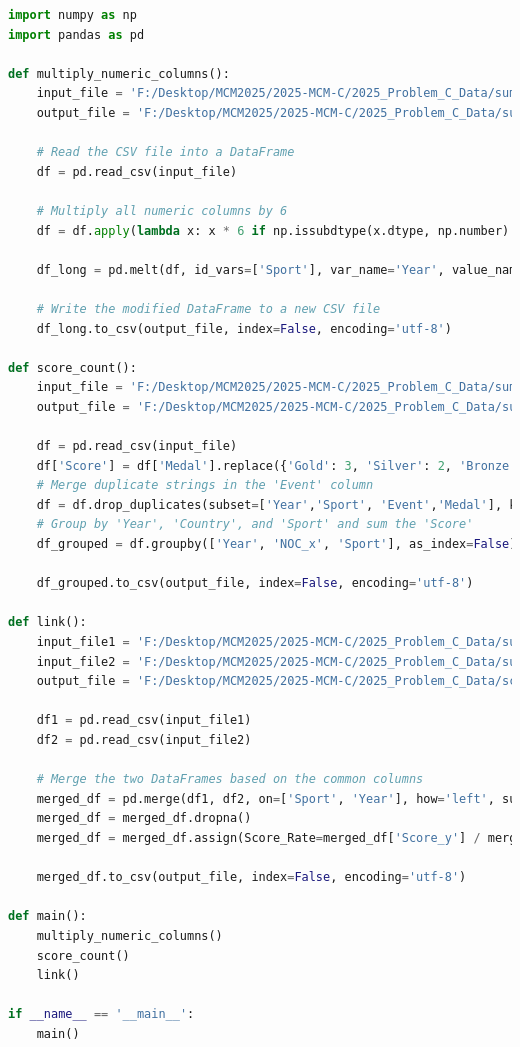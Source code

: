\documentclass[12pt]{article}
\begin{document}
\begin{lstlisting}[language=Python, style=mystyle, caption=calculate\_score\_rate.py]
import numpy as np
import pandas as pd

def multiply_numeric_columns():
    input_file = 'F:/Desktop/MCM2025/2025-MCM-C/2025_Problem_C_Data/summerOly_programs_v4.0.csv'
    output_file = 'F:/Desktop/MCM2025/2025-MCM-C/2025_Problem_C_Data/summerOly_programs_v5.0.csv'

    # Read the CSV file into a DataFrame
    df = pd.read_csv(input_file)

    # Multiply all numeric columns by 6
    df = df.apply(lambda x: x * 6 if np.issubdtype(x.dtype, np.number) else x)

    df_long = pd.melt(df, id_vars=['Sport'], var_name='Year', value_name='Score')

    # Write the modified DataFrame to a new CSV file
    df_long.to_csv(output_file, index=False, encoding='utf-8')

def score_count():
    input_file = 'F:/Desktop/MCM2025/2025-MCM-C/2025_Problem_C_Data/summerOly_athletes_v3.0.csv'
    output_file = 'F:/Desktop/MCM2025/2025-MCM-C/2025_Problem_C_Data/summerOly_athletes_v4.0.csv'

    df = pd.read_csv(input_file)
    df['Score'] = df['Medal'].replace({'Gold': 3, 'Silver': 2, 'Bronze': 1, 'No medal': 0})
    # Merge duplicate strings in the 'Event' column
    df = df.drop_duplicates(subset=['Year','Sport', 'Event','Medal'], keep='first')
    # Group by 'Year', 'Country', and 'Sport' and sum the 'Score'
    df_grouped = df.groupby(['Year', 'NOC_x', 'Sport'], as_index=False)['Score'].sum()

    df_grouped.to_csv(output_file, index=False, encoding='utf-8')

def link():
    input_file1 = 'F:/Desktop/MCM2025/2025-MCM-C/2025_Problem_C_Data/summerOly_programs_v5.0.csv'
    input_file2 = 'F:/Desktop/MCM2025/2025-MCM-C/2025_Problem_C_Data/summerOly_athletes_v4.0.csv'
    output_file = 'F:/Desktop/MCM2025/2025-MCM-C/2025_Problem_C_Data/score_rate.csv'

    df1 = pd.read_csv(input_file1)
    df2 = pd.read_csv(input_file2)

    # Merge the two DataFrames based on the common columns
    merged_df = pd.merge(df1, df2, on=['Sport', 'Year'], how='left', suffixes=('_x', '_y'))
    merged_df = merged_df.dropna()
    merged_df = merged_df.assign(Score_Rate=merged_df['Score_y'] / merged_df['Score_x'])

    merged_df.to_csv(output_file, index=False, encoding='utf-8')

def main():
    multiply_numeric_columns()
    score_count()
    link()

if __name__ == '__main__':
    main()
\end{lstlisting}
\end{document}
